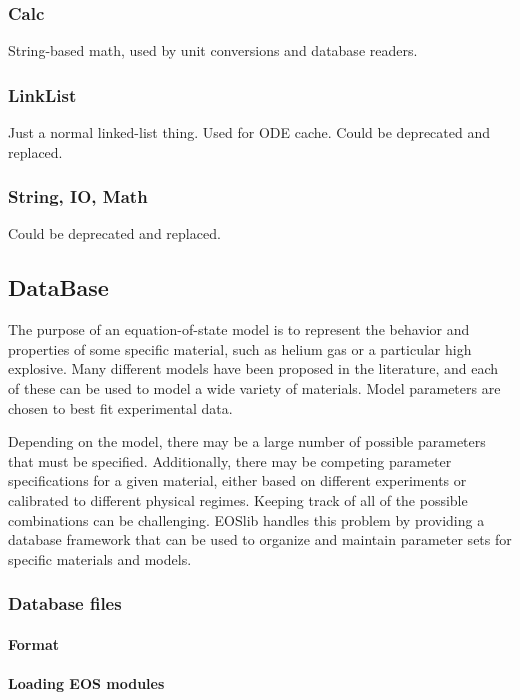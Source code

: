 \documentclass[twocolumn,10pt]{asme2ej}
\begin{document}
\subsubsection{Calc}
String-based math, used by unit conversions and database readers.

\subsubsection{LinkList}
Just a normal linked-list thing. Used for ODE cache. Could be deprecated and replaced.

\subsubsection{String, IO, Math}
Could be deprecated and replaced.

\subsection{DataBase}

The purpose of an equation-of-state model is to represent the behavior and properties of some specific material, such as helium gas or a particular high explosive. Many different models have been proposed in the literature, and each of these can be used to model a wide variety of materials. Model parameters are chosen to best fit experimental data. 

Depending on the model, there may be a large number of possible parameters that must be specified. Additionally, there may be competing parameter specifications for a given material, either based on different experiments or calibrated to different physical regimes. Keeping track of all of the possible combinations can be challenging. EOSlib handles this problem by providing a database framework that can be used to organize and maintain parameter sets for specific materials and models. 

\subsubsection{Database files}

\paragraph{Format}



\paragraph{Loading EOS modules}
\end{document}
